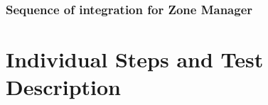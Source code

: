 \documentclass[a4paper,11pt]{report} %
\begin{document}
		\subsubsection{Sequence of integration for Zone Manager}
		\begin{minipage}{\linewidth}
		\end{minipage}							
	
	
	\section{Individual Steps and Test Description}
\end{document}
